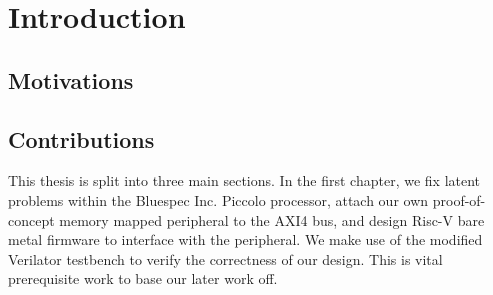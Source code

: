 \documentclass[a4paper,8pt]{report}
\begin{document}
\pagestyle{empty}
\singlespacing

\onehalfspacing

\singlespacing


\setcounter{page}{0}
\pagestyle{plain}
\tableofcontents
\listoffigures
\listoftables

\onehalfspacing


\chapter{Introduction}
\setcounter{page}{1} 
\section{Motivations}











\section{Contributions}
This thesis is split into three main sections. In the first chapter, we fix
latent problems within the Bluespec Inc. Piccolo processor, attach our own
proof-of-concept memory mapped peripheral to the AXI4 bus, and design Risc-V
bare metal firmware to interface with the peripheral. We make use of the
modified Verilator testbench to verify the correctness of our design. This is
vital prerequisite work to base our later work off.
\end{document}
